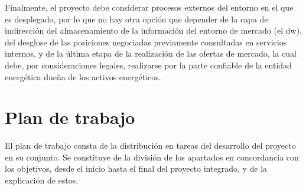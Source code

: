 Finalmente, el proyecto debe considerar procesos externos del entorno en el que es desplegado, por lo que no hay otra opción que depender de la capa de indirección del almacenamiento de la información del entorno de mercado (el \gls{dw}), del desglose de las posiciones negociadas previamente consultadas en servicios internos, y de la última etapa de la realización de las ofertas de mercado, la cual debe, por consideraciones legales, realizarse por la parte confiable de la entidad energética dueña de los activos energéticos.

\section{Plan de trabajo}
\label{makereference1.3}

El plan de trabajo consta de la distribución en tareas del desarrollo del proyecto en su conjunto. Se constituye de la división de los apartados en concordancia con los objetivos, desde el inicio hasta el final del proyecto integrado, y de la explicación de estos.

